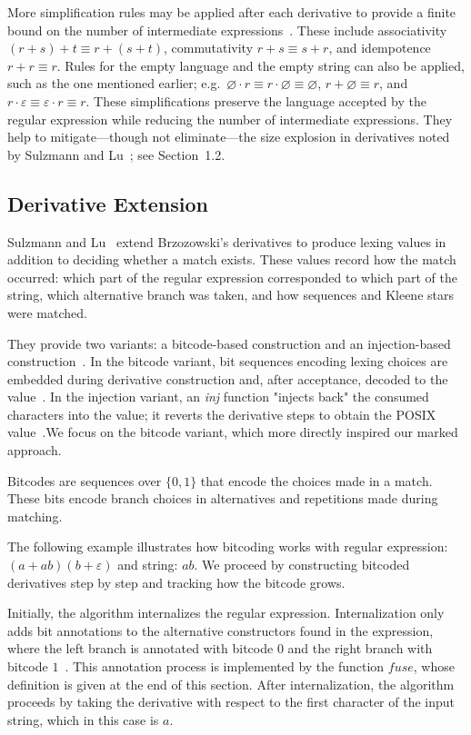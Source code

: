\documentclass[12pt]{article}
\newcommand{\fuse}{\textit{fuse}}
\begin{document}
More simplification rules may be applied after each derivative to provide a finite bound on the number of intermediate 
expressions~\cite{TanAndUrban2023}. These include associativity $(r+s)+t \equiv r+(s+t)$, commutativity $r+s \equiv s+r$, 
and idempotence $r+r \equiv r$. Rules for the empty language and the empty string can also be applied, such as the one 
mentioned earlier; e.g.\ $\varnothing \cdot r \equiv r \cdot \varnothing \equiv \varnothing$, $r+\varnothing \equiv r$, 
and $r \cdot \varepsilon \equiv \varepsilon \cdot r \equiv r$. 
These simplifications preserve the language accepted by the regular expression while reducing the number of intermediate expressions. 
They help to mitigate—though not eliminate—the size explosion in derivatives noted by Sulzmann and Lu~\cite{Sulzmann2014}; see Section~1.2.

\subsection{Derivative Extension}

Sulzmann and Lu~\cite{Sulzmann2014} extend Brzozowski’s derivatives to produce lexing values in addition to deciding whether a match exists. 
These values record how the match occurred: which part of the regular expression corresponded to which part of the string, 
which alternative branch was taken, and how sequences and Kleene stars were matched.

They provide two variants: a bitcode-based construction and an injection-based construction~\cite{Sulzmann2014}.
In the bitcode variant, bit sequences encoding lexing choices are embedded during derivative construction and, after acceptance, decoded to
the value~\cite{Sulzmann2014}. In the injection variant, an \textit{inj} function "injects back" the consumed characters into the value; it reverts 
the derivative steps to obtain the POSIX value~\cite{Sulzmann2014}.We focus on the bitcode variant, which more directly inspired our marked approach.

Bitcodes are  sequences over $\{0,1\}$ that encode the choices made in a match.
These bits encode branch choices in alternatives and repetitions made during matching.

The following example illustrates how bitcoding works with regular expression: $(a+ab)(b+\varepsilon)$ and string: $ab$. 
We proceed by constructing bitcoded derivatives step by step and tracking how the bitcode grows.

Initially, the algorithm internalizes the regular expression. 
Internalization only adds bit annotations to the alternative constructors found in the expression, 
where the left branch is annotated with bitcode $0$ and the right branch with bitcode $1$~\cite{Sulzmann2014}. 
This annotation process is implemented by the function $\fuse$, whose definition is given at the end of this section. 
After internalization, the algorithm proceeds by taking the derivative with respect to the first character 
of the input string, which in this case is $a$.
\end{document}
